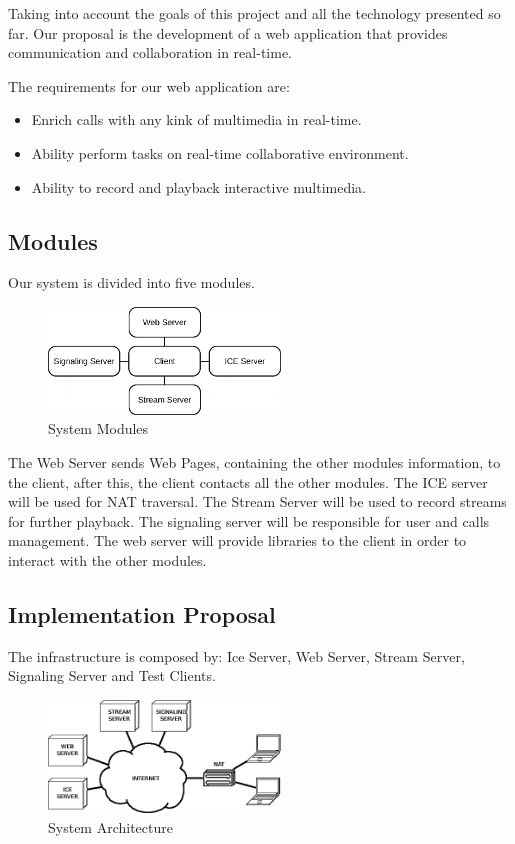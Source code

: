 Taking into account the goals of this project and all the technology presented so far. Our proposal is the development of a web application that provides communication and collaboration in real-time.

The requirements for our web application are:

\begin{itemize}
 \item Enrich calls with any kink of multimedia in real-time.
 \item Ability perform tasks on real-time collaborative environment.
 \item Ability to record and playback interactive multimedia.
\end{itemize}

\subsection{Modules}
	Our system is divided into five modules.

\begin{figure}[H]
	\centering
	\includegraphics[width=0.55\textwidth]{figures/archs.png}
	\caption{System Modules}
\end{figure}

 The Web Server sends Web Pages, containing the other modules information, to the client, after this, the client contacts all the other modules. The ICE server will be used for \ac{NAT} traversal. The Stream Server will be used to record streams for further playback. The signaling server will be responsible for user and calls management. The web server will provide libraries to the client in order to interact with the other modules.  

\subsection{Implementation Proposal}
The infrastructure is composed by: Ice Server, Web Server, Stream Server, Signaling Server and Test Clients.

\begin{figure}[H]
	\centering
	\includegraphics[width=0.55\textwidth]{figures/arch.png}
	\caption{System Architecture}
\end{figure}

